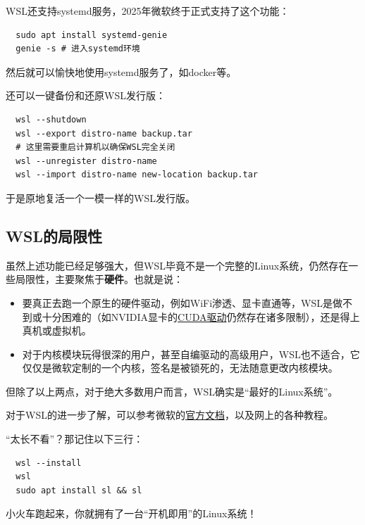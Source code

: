 WSL还支持systemd服务，2025年微软终于正式支持了这个功能：
\begin{verbatim}
  sudo apt install systemd-genie
  genie -s # 进入systemd环境
\end{verbatim}
然后就可以愉快地使用systemd服务了，如docker等。

还可以一键备份和还原WSL发行版：
\begin{verbatim}
  wsl --shutdown
  wsl --export distro-name backup.tar
  # 这里需要重启计算机以确保WSL完全关闭
  wsl --unregister distro-name
  wsl --import distro-name new-location backup.tar
\end{verbatim}
于是原地复活一个一模一样的WSL发行版。

\subsection{WSL的局限性}

虽然上述功能已经足够强大，但WSL毕竟不是一个完整的Linux系统，仍然存在一些局限性，主要聚焦于\textbf{硬件}。也就是说：
\begin{itemize}
  \item 要真正去跑一个原生的硬件驱动，例如WiFi渗透、显卡直通等，WSL是做不到或十分困难的（如NVIDIA显卡的\href{https://docs.nvidia.com/cuda/wsl-user-guide/}{CUDA驱动}仍然存在诸多限制），还是得上真机或虚拟机。
  \item 对于内核模块玩得很深的用户，甚至自编驱动的高级用户，WSL也不适合，它仅仅是微软定制的一个内核，签名是被锁死的，无法随意更改内核模块。
\end{itemize}
但除了以上两点，对于绝大多数用户而言，WSL确实是“最好的Linux系统”。

对于WSL的进一步了解，可以参考微软的\href{https://learn.microsoft.com/en-us/windows/wsl/}{官方文档}，以及网上的各种教程。

“太长不看”？那记住以下三行：
\begin{verbatim}
  wsl --install
  wsl
  sudo apt install sl && sl
\end{verbatim}
小火车跑起来，你就拥有了一台“开机即用”的Linux系统！
